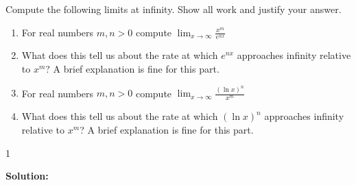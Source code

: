 \documentclass[9pt]{article}
\def\solutions{1}
\begin{document}
\fi
\newpage



\vspace{5mm}

\item Compute the following limits at infinity.  Show all work and justify your answer.

\begin{enumerate}
\item For real numbers $m, n > 0$ compute $ \displaystyle \lim_{x \to \infty} \frac{x^m}{e^{nx}} $
\item What does this tell us about the rate at which $e^{nx}$ approaches infinity relative to $x^m$? A brief explanation is fine for this part.
\item For real numbers $m, n > 0$ compute $ \displaystyle  \lim_{x \to  \infty} \frac{(\ln  x)^n}{x^m} $
\item What does this tell us about the rate at which $(\ln  x)^n$ approaches infinity relative to $x^m$? A brief explanation is fine for this part.
\end{enumerate}
\if\solutions1
\vspace{2mm}

\textbf{Solution:} \\
\end{document}
